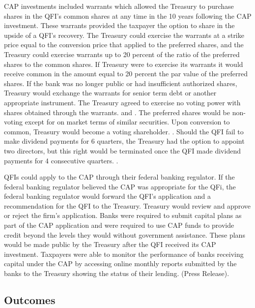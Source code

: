 \documentclass[12pt]{article}
\begin{document}
CAP investments included warrants which allowed the Treasury to purchase shares in the QFI's common shares at any time in the 10 years following the CAP investment. These warrants provided the taxpayer the option to share in the upside of a QFI's recovery. The Treasury could exercise the warrants at a strike price equal to the conversion price that applied to the preferred shares, and the Treasury could exercise warrants up to 20 percent of the ratio of the preferred shares to the common shares. If Treasury were to exercise its warrants it would receive common in the amount equal to 20 percent the par value of the preferred shares. If the bank was no longer public or had insufficient authorized shares, Treasury would exchange the warrants for senior term debt or another appropriate instrument. The Treasury agreed to exercise no voting power with shares obtained through the warrants. \citep{WhitePaper} and \citep{GW}. The preferred shares would be non-voting except for on market terms of similar securities. Upon conversion to common, Treasury would become a voting shareholder. \citep{Mofo}. Should the QFI fail to make dividend payments for 6 quarters, the Treasury had the option to appoint two directors, but this right would be terminated once the QFI made dividend payments for 4 consecutive quarters. \citep{Mofo}.

QFIs could apply to the CAP through their federal banking regulator. If the federal banking regulator believed the CAP was appropriate for the QFi, the federal banking regulator would forward the QFI's application and a recommendation for the QFI to the Treasury. Treasury would review and approve or reject the firm's application. Banks were required to submit capital plans as part of the CAP application and were required to use CAP funds to provide credit beyond the levels they would without government assistance. These plans would be made public by the Treasury after the QFI received its CAP investment. Taxpayers were able to monitor the performance of banks receiving capital under the CAP by accessing online monthly reports submitted by the banks to the Treasury showing the status of their lending. (Press Release).

\subsection{Outcomes}
\end{document}

